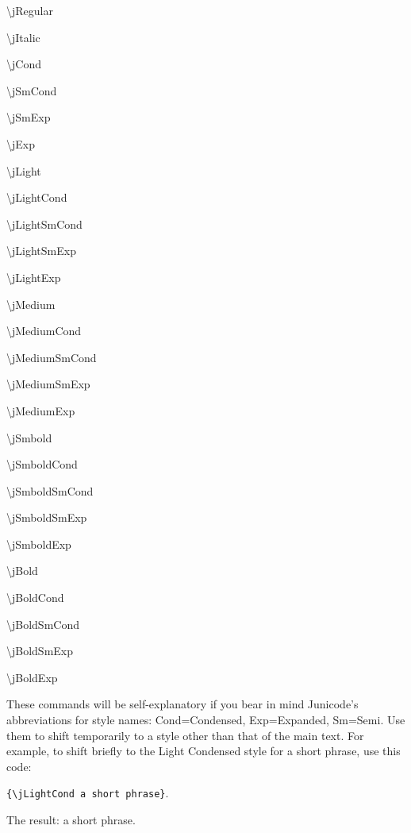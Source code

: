 \documentclass[12pt]{article}
\begin{document}
\begin{multicols}{3}
    \jCond\textbackslash jRegular

    \textbackslash jItalic
    
    \textbackslash jCond
    
    \textbackslash jSmCond
    
    \textbackslash jSmExp
    
    \textbackslash jExp
    
    \textbackslash jLight
    
    \textbackslash jLightCond
    
    \textbackslash jLightSmCond
    
    \textbackslash jLightSmExp
    
    \textbackslash jLightExp
    
    \textbackslash jMedium
    
    \textbackslash jMediumCond
    
    \textbackslash jMediumSmCond
    
    \textbackslash jMediumSmExp
    
    \textbackslash jMediumExp
    
    \textbackslash jSmbold
    
    \textbackslash jSmboldCond
    
    \textbackslash jSmboldSmCond
    
    \textbackslash jSmboldSmExp
    
    \textbackslash jSmboldExp
    
    \textbackslash jBold
    
    \textbackslash jBoldCond
    
    \textbackslash jBoldSmCond
    
    \textbackslash jBoldSmExp
    
    \textbackslash jBoldExp
    
\end{multicols}

\noindent These commands will be self-explanatory if you bear in mind Junicode's 
abbreviations for style names: Cond=Condensed, Exp=Expanded, Sm=Semi. Use
them to shift temporarily to a style other than that of the main text.
For example, to shift briefly to the Light Condensed style for a short phrase, use
this code:
\begin{center}
{\small\verb|{\jLightCond a short phrase}|}.
\end{center}
The result: {\jLightCond a short phrase}.
\end{document}
